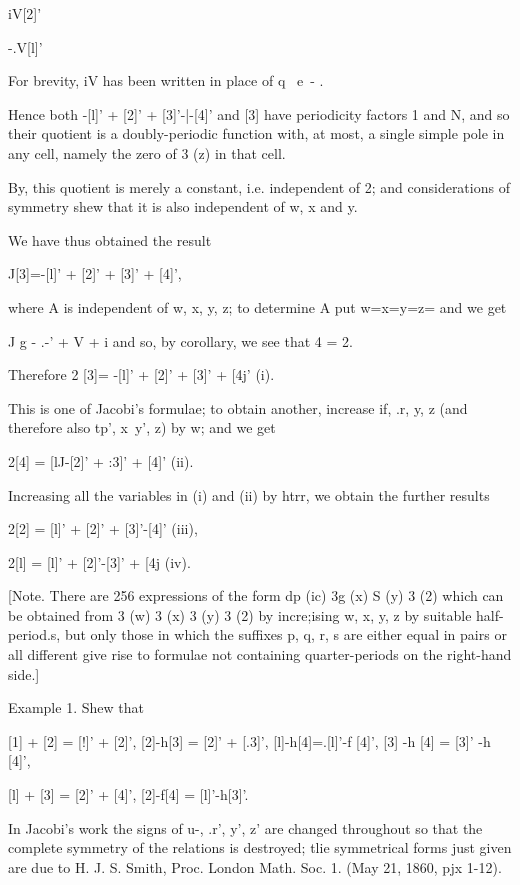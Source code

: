 iV[2]'

-.V[l]'

For brevity, iV has been written in place of q~ e~- .

Hence both -[l]' + [2]' + [3]'-|-[4]' and [3] have periodicity factors
1 and N, and so their quotient is a doubly-periodic function with, at
most, a single simple pole in any cell, namely the zero of 3 (z) in
that cell.

By, this quotient is merely a constant, i.e. independent of 2;
and considerations of symmetry shew that it is also independent of w,
x and y.

We have thus obtained the result

J[3]=-[l]' + [2]' + [3]' + [4]',

where A is independent of w, x, y, z; to determine A put w=x=y=z= and
we get

J g - .-' + V + i and so, by corollary, we see that 4 = 2.

Therefore 2 [3]= -[l]' + [2]' + [3]' + [4j' (i).

This is one of Jacobi's formulae; to obtain another, increase if, .r,
y, z (and therefore also tp', x\ y', z) by w; and we get

2[4] = [lJ-[2]' + :3]' + [4]' (ii).

Increasing all the variables in (i) and (ii) by htrr, we obtain the
further results

2[2] = [l]' + [2]' + [3]'-[4]' (iii),

2[l] = [l]' + [2]'-[3]' + [4j (iv).

[Note. There are 256 expressions of the form dp (ic) 3g (x) S (y) 3
(2) which can be obtained from 3 (w) 3 (x) 3 (y) 3 (2) by incre;ising
w, x, y, z by suitable half-period.s, but only those in which the
suffixes p, q, r, s are either equal in pairs or all different give
rise to formulae not containing quarter-periods on the right-hand
side.]

Example 1. Shew that

[1] + [2] = [!]' + [2]', [2]-h[3] = [2]' + [.3]', [l]-h[4]=.[l]'-f
[4]', [3] -h [4] = [3]' -h [4]',

[l] + [3] = [2]' + [4]', [2]-f[4] = [l]'-h[3]'.

In Jacobi's work the signs of u-, .r', y', z' are changed throughout
so that the complete symmetry of the relations is destroyed; tlie
symmetrical forms just given are due to H. J. S. Smith, Proc. London
Math. Soc. 1. (May 21, 1860, pjx 1-12).

